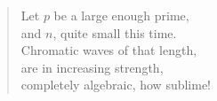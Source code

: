 


\vspace*{7cm}

\begin{verse}
    \hspace{8em}Let $p$ be a large enough prime, \\
    \vspace{5pt}
    \hspace{8em}and $n$, quite small this time. \\
    \vspace{5pt}
    \hspace{8em}Chromatic waves of that length, \\
    \vspace{5pt}
    \hspace{8em}are in increasing strength, \\
    \vspace{5pt}
    \hspace{8em}completely algebraic, how sublime! 

\end{verse}

